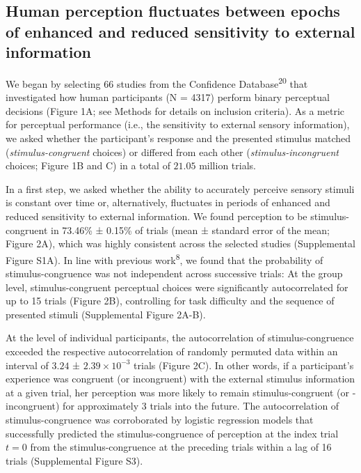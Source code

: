 \documentclass[
]{article}
\begin{document}
\hypertarget{human-perception-fluctuates-between-epochs-of-enhanced-and-reduced-sensitivity-to-external-information}{%
\subsection{Human perception fluctuates between epochs of enhanced and
reduced sensitivity to external
information}\label{human-perception-fluctuates-between-epochs-of-enhanced-and-reduced-sensitivity-to-external-information}}

We began by selecting 66 studies from the Confidence
Database\textsuperscript{20} that investigated how human participants (N
= 4317) perform binary perceptual decisions (Figure 1A; see Methods for
details on inclusion criteria). As a metric for perceptual performance
(i.e., the sensitivity to external sensory information), we asked
whether the participant's response and the presented stimulus matched
(\emph{stimulus-congruent} choices) or differed from each other
(\emph{stimulus-incongruent} choices; Figure 1B and C) in a total of
\(21.05\) million trials.

In a first step, we asked whether the ability to accurately perceive
sensory stimuli is constant over time or, alternatively, fluctuates in
periods of enhanced and reduced sensitivity to external information. We
found perception to be stimulus-congruent in 73.46\% ± 0.15\% of trials
(mean ± standard error of the mean; Figure 2A), which was highly
consistent across the selected studies (Supplemental Figure S1A). In
line with previous work\textsuperscript{8}, we found that the
probability of stimulus-congruence was not independent across successive
trials: At the group level, stimulus-congruent perceptual choices were
significantly autocorrelated for up to 15 trials (Figure 2B),
controlling for task difficulty and the sequence of presented stimuli
(Supplemental Figure 2A-B).

At the level of individual participants, the autocorrelation of
stimulus-congruence exceeded the respective autocorrelation of randomly
permuted data within an interval of \(3.24\) ±
\(\ensuremath{2.39\times 10^{-3}}\) trials (Figure 2C). In other words,
if a participant's experience was congruent (or incongruent) with the
external stimulus information at a given trial, her perception was more
likely to remain stimulus-congruent (or -incongruent) for approximately
3 trials into the future. The autocorrelation of stimulus-congruence was
corroborated by logistic regression models that successfully predicted
the stimulus-congruence of perception at the index trial \(t = 0\) from
the stimulus-congruence at the preceding trials within a lag of 16
trials (Supplemental Figure S3).
\end{document}
